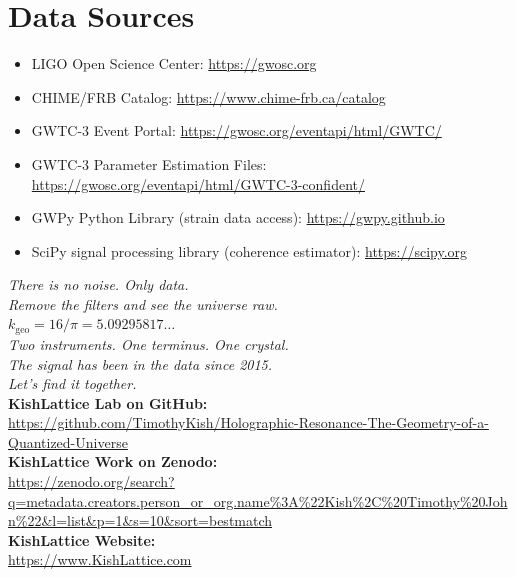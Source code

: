 \documentclass[11pt, letterpaper, openany]{book}
\begin{document}
\section*{Data Sources}
\begin{itemize}
    \item LIGO Open Science Center: \url{https://gwosc.org}
    \item CHIME/FRB Catalog: \url{https://www.chime-frb.ca/catalog}
    \item GWTC-3 Event Portal: \url{https://gwosc.org/eventapi/html/GWTC/}
    \item GWTC-3 Parameter Estimation Files: \url{https://gwosc.org/eventapi/html/GWTC-3-confident/}
    \item GWPy Python Library (strain data access): \url{https://gwpy.github.io}
    \item SciPy signal processing library (coherence estimator): \url{https://scipy.org}
\end{itemize}

\vfill
\begin{center}
\large
\textit{There is no noise. Only data.}\\
\textit{Remove the filters and see the universe raw.}\\[1em]
\normalsize
$k_\text{geo} = 16/\pi = 5.09295817\ldots$\\[0.5em]
\textit{Two instruments. One terminus. One crystal.}\\[0.5em]
\textit{The signal has been in the data since 2015.}\\
\textit{Let's find it together.}\\[1em]

\small
\textbf{KishLattice Lab on GitHub:}\\
\url{https://github.com/TimothyKish/Holographic-Resonance-The-Geometry-of-a-Quantized-Universe}\\[0.5em]
\textbf{KishLattice Work on Zenodo:}\\
\url{https://zenodo.org/search?q=metadata.creators.person_or_org.name%3A%22Kish%2C%20Timothy%20John%22&l=list&p=1&s=10&sort=bestmatch}\\[0.5em]
\textbf{KishLattice Website:}\\[0.5em]
\url{https://www.KishLattice.com}
\end{center}
\end{document}
